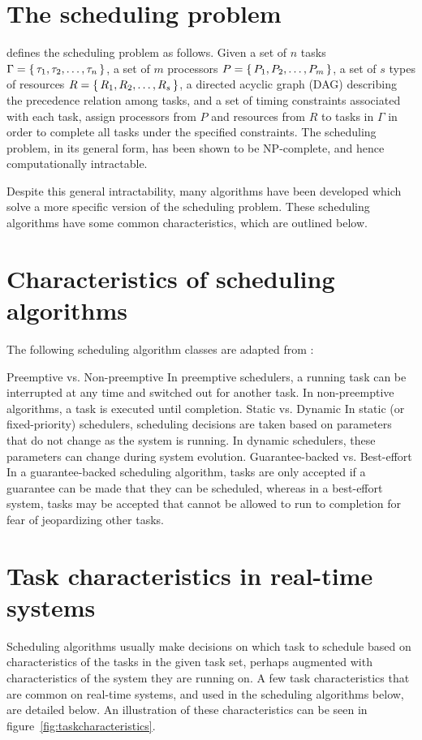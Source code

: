 \documentclass[twoside]{uva-inf-bachelor-thesis}
\begin{document}
\section{The scheduling problem}
\textcite{buttazzo2011hard} defines the scheduling problem as follows. Given a set of $n$ tasks $\Gamma = \set{\tau_1, \tau_2, \ldots, \tau_n}$, a set of $m$ processors $P = \set{P_1, P_2, \ldots, P_m}$, a set of $s$ types of resources $R = \set{R_1, R_2, \ldots, R_s}$, a directed acyclic graph (DAG) describing the precedence relation among tasks, and a set of timing constraints associated with each task, assign processors from $P$ and resources from $R$ to tasks in $\Gamma$ in order to complete all tasks under the specified constraints. The scheduling problem, in its general form, has been shown to be NP-complete, and hence computationally intractable.

Despite this general intractability, many algorithms have been developed which solve a more specific version of the scheduling problem. These scheduling algorithms have some common characteristics, which are outlined below.

\section{Characteristics of scheduling algorithms}
The following scheduling algorithm classes are adapted from \textcite{buttazzo2011hard}:
\begin{outline}
    \1 Preemptive vs. Non-preemptive
        \2 In preemptive schedulers, a running task can be interrupted at any time and switched out for another task.
        \2 In non-preemptive algorithms, a task is executed until completion.
    \1 Static vs. Dynamic
        \2 In static (or fixed-priority) schedulers, scheduling decisions are taken based on parameters that do not change as the system is running. In dynamic schedulers, these parameters can change during system evolution.
    \1 Guarantee-backed vs. Best-effort
        \2 In a guarantee-backed scheduling algorithm, tasks are only accepted if a guarantee can be made that they can be scheduled, whereas in a best-effort system, tasks may be accepted that cannot be allowed to run to completion for fear of jeopardizing other tasks.
\end{outline}

\section{Task characteristics in real-time systems}
Scheduling algorithms usually make decisions on which task to schedule based on characteristics of the tasks in the given task set, perhaps augmented with characteristics of the system they are running on. A few task characteristics that are common on real-time systems, and used in the scheduling algorithms below, are detailed below. An illustration of these characteristics can be seen in figure~\ref{fig:taskcharacteristics}.
\end{document}
